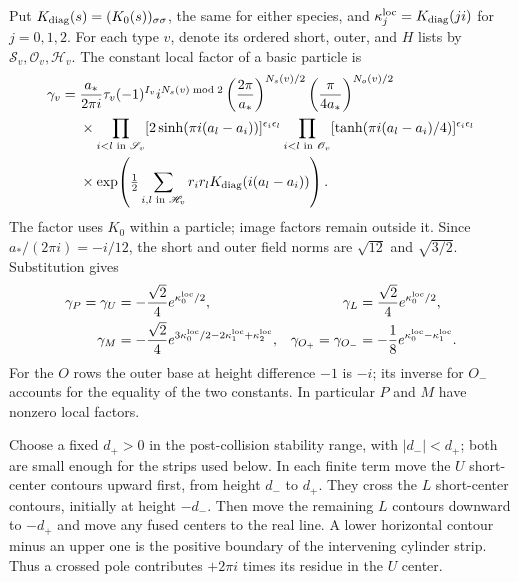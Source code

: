 Put $K_{\rm diag}(s)=(K_0(s))_{\sigma\sigma}$, the same for either species,
and $\kappa_j^{\rm loc}=K_{\rm diag}(ji)$ for $j=0,1,2$.  For each type $v$, denote its
ordered short, outer, and $H$ lists by $\mathscr S_v,\mathscr O_v,\mathscr H_v$.
The constant local factor of a basic particle is
\begin{equation}\label{c7:local-factor-rule}
\begin{split}
\gamma_v={}&\frac{a_*}{2\pi i}\tau_v(-1)^{I_v}i^{N_s(v)\bmod2}
 \left(\frac{2\pi}{a_*}\right)^{N_s(v)/2}
 \left(\frac{\pi}{4a_*}\right)^{N_o(v)/2}\\
&\times\prod_{i<l\text{ in }\mathscr S_v}
 [2\sinh(\pi i(a_l-a_i))]^{\epsilon_i\epsilon_l}
 \prod_{i<l\text{ in }\mathscr O_v}
 [\tanh(\pi i(a_l-a_i)/4)]^{\epsilon_i\epsilon_l}\\
&\times\exp\!\left(\tfrac12\sum_{i,l\text{ in }\mathscr H_v}
 r_ir_l K_{\rm diag}(i(a_l-a_i))\right).
\end{split}
\end{equation}
The factor uses $K_0$ within a particle; image factors remain outside it.
Since $a_* /(2\pi i)=-i/12$, the short and outer field norms are
$\sqrt{12}$ and $\sqrt{3/2}$.  Substitution gives
\begin{equation}\label{c7:basic-activities}
\begin{aligned}
\gamma_P=\gamma_U&=-\frac{\sqrt2}{4}e^{\kappa_0^{\rm loc}/2},
&\gamma_L&=\frac{\sqrt2}{4}e^{\kappa_0^{\rm loc}/2},\\
\gamma_M&=-\frac{\sqrt2}{4}e^{3\kappa_0^{\rm loc}/2-2\kappa_1^{\rm loc}+\kappa_2^{\rm loc}},
&\gamma_{O_+}=\gamma_{O_-}&=-\frac18e^{\kappa_0^{\rm loc}-\kappa_1^{\rm loc}}.
\end{aligned}
\end{equation}
For the $O$ rows the outer base at height difference $-1$ is $-i$; its
inverse for $O_-$ accounts for the equality of the two constants.  In
particular $P$ and $M$ have nonzero local factors.

Choose a fixed $d_+>0$ in the post-collision stability range, with
$|d_-|<d_+$; both are small enough for the strips used below.  In each finite
term move the $U$ short-center contours upward first, from height $d_-$ to
$d_+$.  They cross the $L$ short-center contours, initially at height
$-d_-$.  Then move the remaining $L$ contours downward to $-d_+$ and move
any fused centers to the real line.  A lower horizontal contour minus an
upper one is the positive boundary of the intervening cylinder strip.
Thus a crossed pole contributes $+2\pi i$ times its residue in the $U$
center.

